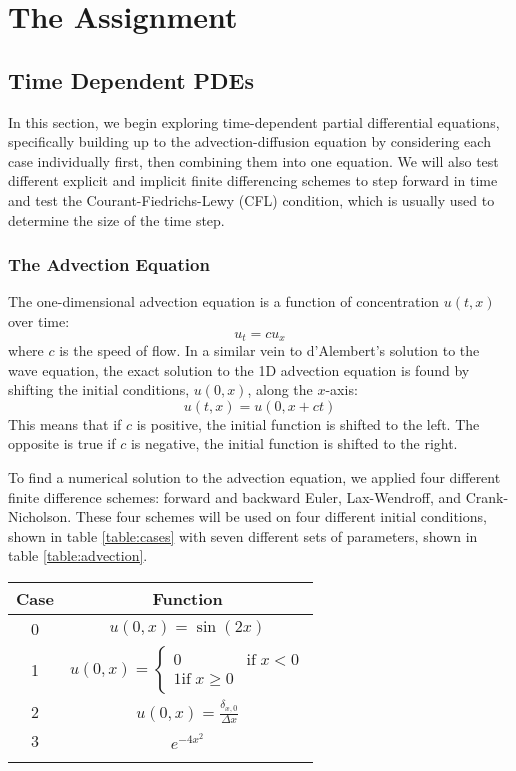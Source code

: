 \message{ !name(austin_report.tex)}\documentclass[twocolumn]{article}
\begin{document}

\section{The Assignment}

\subsection{Time Dependent PDEs}

In this section, we begin exploring time-dependent partial
differential equations, specifically building up to the
advection-diffusion equation by considering each case individually
first, then combining them into one equation. We will also test
different explicit and implicit finite differencing schemes to step
forward in time and test the Courant-Fiedrichs-Lewy (CFL) condition,
which is usually used to determine the size of the time step.

\subsubsection{The Advection Equation}

The one-dimensional advection equation is a function of
concentration $u(t, x)$ over time:
\begin{equation}
  u_t = c u_x
\end{equation}
where $c$ is the speed of flow. In a similar vein to d'Alembert's
solution to the wave equation, the exact solution to the 1D advection
equation is found by shifting the initial conditions, $u(0, x)$, along
the $x$-axis:
\begin{equation}
  u(t, x) = u(0, x + ct)
\end{equation}
This means that if $c$ is positive, the initial function is shifted to
the left. The opposite is true if $c$ is negative, the initial
function is shifted to the right.

To find a numerical solution to the advection equation, we applied
four different finite difference schemes: forward and backward Euler,
Lax-Wendroff, and Crank-Nicholson. These four schemes will be used on
four different initial conditions, shown in table \ref{table:cases}
with seven different sets of parameters, shown in table
\ref{table:advection}.

\begin{tabular}{c|c}
  Case & Function \\ \hline \hline
  0    & $u(0, x) = \sin(2 x)$ \\ \hline
  1    & $u(0, x) = \begin{cases} 0 & \text{if} \; x < 0 \\ 1
    \text{if} \; x \geq 0 \end{cases}$ \\ \hline
  2    & $u(0, x) = \frac{\delta_{x, 0}}{\Delta x}$ \\ \hline
  3    & $e^{- 4 x^2}$ \\ \hline
  \label{table:cases}
\end{tabular}
\end{document}
